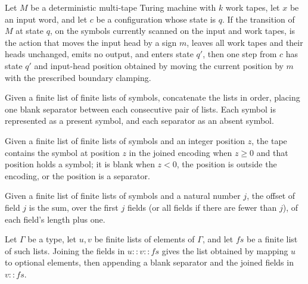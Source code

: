\begin{theorem}
\label{Turing.step_of_inputMoveAction}
\leanok
{}
Let $M$ be a deterministic multi-tape Turing machine with $k$ work tapes, let $x$ be an
input word, and let $c$ be a configuration whose state is $q$. If the transition of $M$
at state $q$, on the symbols currently scanned on the input and work tapes, is the
action that moves the input head by a sign $m$, leaves all work tapes and their heads
unchanged, emits no output, and enters state $q'$, then one step from $c$ has state $q'$
and input-head position obtained by moving the current position by $m$ with the
prescribed boundary clamping.
\end{theorem}

\begin{definition}
\label{Turing.joinFields}
\leanok
Given a finite list of finite lists of symbols, concatenate the lists in order, placing
one blank separator between each consecutive pair of lists. Each symbol is represented
as a present symbol, and each separator as an absent symbol.
\end{definition}

\begin{definition}
\label{Turing.fieldsTape}
\leanok
{}
Given a finite list of finite lists of symbols and an integer position $z$, the tape
contains the symbol at position $z$ in the joined encoding when $z\ge 0$ and that
position holds a symbol; it is blank when $z<0$, the position is outside the encoding,
or the position is a separator.
\end{definition}

\begin{definition}
\label{Turing.fieldOffset}
\leanok
Given a finite list of finite lists of symbols and a natural number $j$, the offset of
field $j$ is the sum, over the first $j$ fields (or all fields if there are fewer than
$j$), of each field's length plus one.
\end{definition}

\begin{theorem}
\label{Turing.joinFields_cons_cons}
\leanok
{}
Let $\Gamma$ be a type, let $u,v$ be finite lists of elements of $\Gamma$, and let $fs$
be a finite list of such lists. Joining the fields in $u::v::fs$ gives the list obtained
by mapping $u$ to optional elements, then appending a blank separator and the joined
fields in $v::fs$.
\end{theorem}

